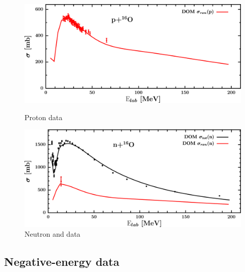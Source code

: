 \begin{figure}[H]
    \centering
    \begin{minipage}{0.45\textwidth}
        \centering
        \includegraphics[width=1.0\textwidth]{figures/o16_protonInelastic.png}
        \caption{Proton \rxn data}
        \label{DOMFitData_o16_proton_inelastic}
    \end{minipage}\hfill
    \begin{minipage}{0.45\textwidth}
        \centering
        \includegraphics[width=1.0\textwidth]{figures/o16_neutronInelastic.png}
        \caption{Neutron \rxn and \tot data}
        \label{DOMFitData_o16_neutron_inelastic}
    \end{minipage}
\end{figure}

\afterpage{\clearpage}

\subsection{Negative-energy data}

